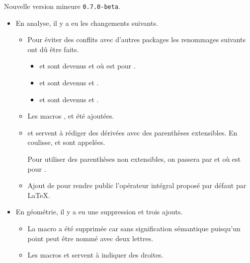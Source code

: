 Nouvelle version mineure \verb+0.7.0-beta+.

\begin{itemize}[itemsep=.5em]
    \item En analyse, il y a eu les changements suivants.
    \begin{itemize}[itemsep=.5em]
        \item Pour éviter des conflits avec d'autres packages les renommages suivants ont dû être faits.
        \begin{itemize}[itemsep=.5em]
            \item {} et  sont devenus  et  où  est pour .

            \item {} et  sont devenus  et .

            \item {} et  sont devenus  et .
        \end{itemize}

		\item Les macros ,  et  été ajoutées.

 		\item {} et  servent à rédiger des dérivées avec des parenthèses extensibles. En coulisse,  et  sont appelées.

        Pour utiliser des parenthèses non extensibles, on passera par  et  où  est pour .

		\item Ajout de  pour rendre public l'opérateur intégral proposé par défaut par \LaTeX.
    \end{itemize}


    \item En géométrie, il y a eu une suppression et trois ajouts.
    \begin{itemize}[itemsep=.5em]
        \item La macro  a été supprimée car sans signification sémantique puisqu'un point peut être nommé avec deux lettres.

        \item Les macros  et  servent à indiquer des droites.


\end{itemize}
\end{itemize}
